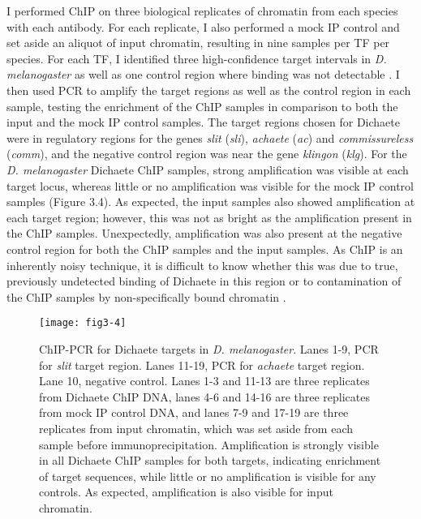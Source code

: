 I performed ChIP on three biological replicates of chromatin from each species with each antibody. For each replicate, I also performed a mock IP control and set aside an aliquot of input chromatin, resulting in nine samples per TF per species. For each TF, I identified three high-confidence target intervals in \emph{D. melanogaster} as well as one control region where binding was not detectable \citep{aleksic_role_2013,ferrero_soxneuro_2014}. I then used PCR to amplify the target regions as well as the control region in each sample, testing the enrichment of the ChIP samples in comparison to both the input and the mock IP control samples. The target regions chosen for Dichaete were in regulatory regions for the genes \emph{slit} (\emph{sli}), \emph{achaete} (\emph{ac}) and \emph{commissureless} (\emph{comm}), and the negative control region was near the gene \emph{klingon} (\emph{klg}). For the \emph{D. melanogaster} Dichaete ChIP samples, strong amplification was visible at each target locus, whereas little or no amplification was visible for the mock IP control samples (Figure 3.4). As expected, the input samples also showed amplification at each target region; however, this was not as bright as the amplification present in the ChIP samples. Unexpectedly, amplification was also present at the negative control region for both the ChIP samples and the input samples. As ChIP is an inherently noisy technique, it is difficult to know whether this was due to true, previously undetected binding of Dichaete in this region or to contamination of the ChIP samples by non-specifically bound chromatin \citep{aleksic_chiping_2009,buck_chip-chip:_2004}.\\

\begin{figure}
\centering
\texttt{[image: fig3-4]}
\caption{ChIP-PCR for Dichaete targets in \emph{D. melanogaster}. Lanes 1-9, PCR for \emph{slit} target region. Lanes 11-19, PCR for \emph{achaete} target region. Lane 10, negative control. Lanes 1-3 and 11-13 are three replicates from Dichaete ChIP DNA, lanes 4-6 and 14-16 are three replicates from mock IP control DNA, and lanes 7-9 and 17-19 are three replicates from input chromatin, which was set aside from each sample before immunoprecipitation. Amplification is strongly visible in all Dichaete ChIP samples for both targets, indicating enrichment of target sequences, while little or no amplification is visible for any controls. As expected, amplification is also visible for input chromatin.}
\label{Figure 3.4}
\end{figure}

